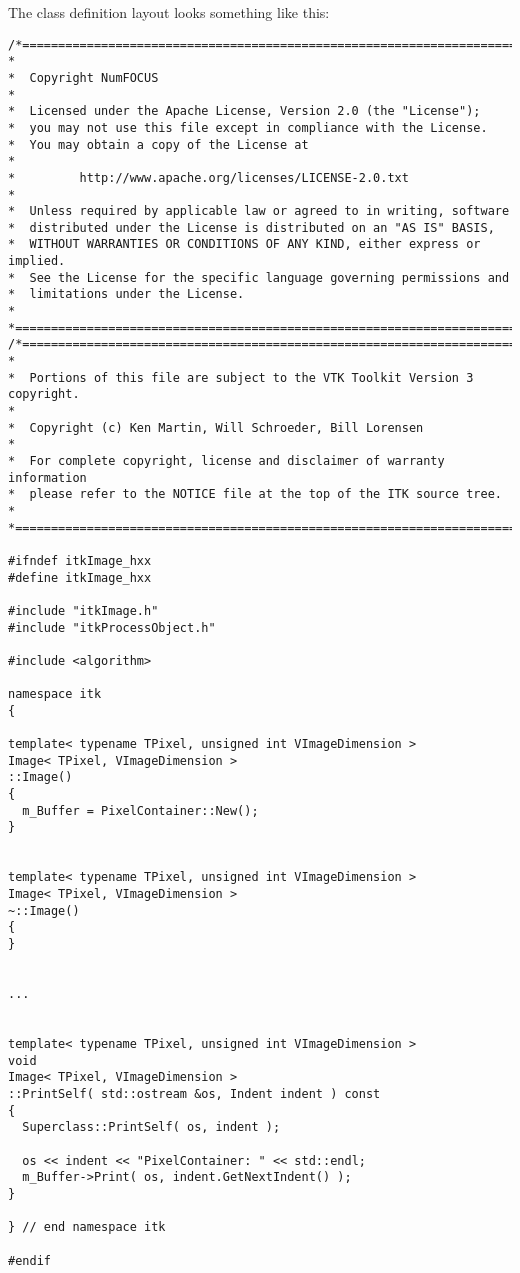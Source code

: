 The class definition layout looks something like this:

\small
\begin{verbatim}
/*=========================================================================
*
*  Copyright NumFOCUS
*
*  Licensed under the Apache License, Version 2.0 (the "License");
*  you may not use this file except in compliance with the License.
*  You may obtain a copy of the License at
*
*         http://www.apache.org/licenses/LICENSE-2.0.txt
*
*  Unless required by applicable law or agreed to in writing, software
*  distributed under the License is distributed on an "AS IS" BASIS,
*  WITHOUT WARRANTIES OR CONDITIONS OF ANY KIND, either express or implied.
*  See the License for the specific language governing permissions and
*  limitations under the License.
*
*=========================================================================*/
/*=========================================================================
*
*  Portions of this file are subject to the VTK Toolkit Version 3 copyright.
*
*  Copyright (c) Ken Martin, Will Schroeder, Bill Lorensen
*
*  For complete copyright, license and disclaimer of warranty information
*  please refer to the NOTICE file at the top of the ITK source tree.
*
*=========================================================================*/

#ifndef itkImage_hxx
#define itkImage_hxx

#include "itkImage.h"
#include "itkProcessObject.h"

#include <algorithm>

namespace itk
{

template< typename TPixel, unsigned int VImageDimension >
Image< TPixel, VImageDimension >
::Image()
{
  m_Buffer = PixelContainer::New();
}


template< typename TPixel, unsigned int VImageDimension >
Image< TPixel, VImageDimension >
~::Image()
{
}


...


template< typename TPixel, unsigned int VImageDimension >
void
Image< TPixel, VImageDimension >
::PrintSelf( std::ostream &os, Indent indent ) const
{
  Superclass::PrintSelf( os, indent );

  os << indent << "PixelContainer: " << std::endl;
  m_Buffer->Print( os, indent.GetNextIndent() );
}

} // end namespace itk

#endif
\end{verbatim}
\normalsize

